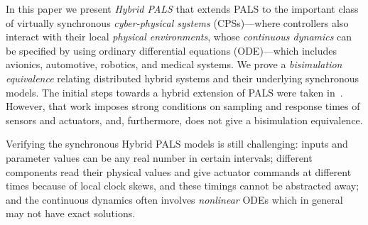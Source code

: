 In this paper
we present \emph{Hybrid PALS} that extends  PALS 
to the important class of virtually synchronous \emph{cyber-physical
  systems} (CPSs)---where controllers also interact with their local \emph{physical environments},
whose \emph{continuous dynamics} can be  specified by using ordinary
differential equations (ODE)---which includes avionics, automotive, robotics, and medical systems. 
We prove a \emph{bisimulation equivalence} relating
distributed hybrid systems and their underlying synchronous models.
%
The initial steps towards a hybrid extension of PALS were taken
in~\cite{hybrid-pals}. However, 
that work imposes strong  conditions on sampling and response times
of sensors and actuators, and, furthermore,  does not give 
a bisimulation equivalence. %





Verifying the synchronous Hybrid PALS models is still challenging:
inputs and parameter values can be any real number in certain
intervals; different components  read their physical values and give
actuator commands at  different times 
because of  local clock skews, and these timings cannot be abstracted
away; and the continuous dynamics  often involves 
\emph{nonlinear} ODEs
which in general may not have exact solutions.



